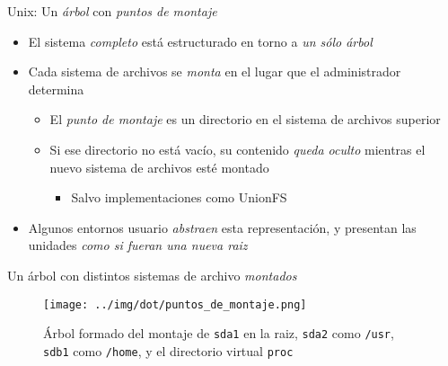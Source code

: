 \documentclass[presentation]{beamer}
\begin{document}
\begin{frame}[label={sec:orgd12057a}]{Unix: Un \emph{árbol} con \emph{puntos de montaje}}
\begin{itemize}
\item El sistema \emph{completo} está estructurado en torno a \emph{un sólo árbol}
\item Cada sistema de archivos se \emph{monta} en el lugar que el administrador
determina
\begin{itemize}
\item El \emph{punto de montaje} es un directorio en el sistema de archivos
superior
\item Si ese directorio no está vacío, su contenido \emph{queda oculto}
mientras el nuevo sistema de archivos esté montado
\begin{itemize}
\item Salvo implementaciones como UnionFS
\end{itemize}
\end{itemize}
\item Algunos entornos usuario \emph{abstraen} esta representación, y presentan
las unidades \emph{como si fueran una nueva raiz}
\end{itemize}
\end{frame}

\begin{frame}[label={sec:org52537e5}]{Un árbol con distintos sistemas de archivo \emph{montados}}
\begin{figure}[htbp]
\centering
\texttt{[image: ../img/dot/puntos\_de\_montaje.png]}
\caption{Árbol formado del montaje de \texttt{sda1} en la raiz, \texttt{sda2} como \texttt{/usr}, \texttt{sdb1} como \texttt{/home}, y el directorio virtual \texttt{proc}}
\end{figure}
\end{frame}
\end{document}
